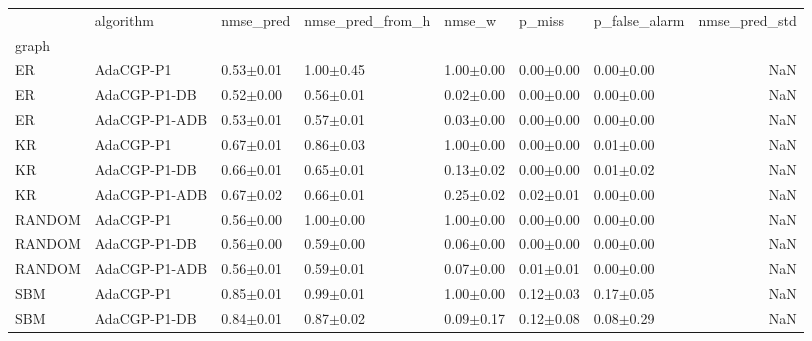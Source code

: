 \begin{tabular}{lllllllr}
\toprule
 & algorithm & nmse_pred & nmse_pred_from_h & nmse_w & p_miss & p_false_alarm & nmse_pred_std \\
graph &  &  &  &  &  &  &  \\
\midrule
ER & AdaCGP-P1 & 0.53{\scriptsize$\pm$0.01} & 1.00{\scriptsize$\pm$0.45} & 1.00{\scriptsize$\pm$0.00} & 0.00{\scriptsize$\pm$0.00} & 0.00{\scriptsize$\pm$0.00} & NaN \\
ER & AdaCGP-P1-DB & 0.52{\scriptsize$\pm$0.00} & 0.56{\scriptsize$\pm$0.01} & 0.02{\scriptsize$\pm$0.00} & 0.00{\scriptsize$\pm$0.00} & 0.00{\scriptsize$\pm$0.00} & NaN \\
ER & AdaCGP-P1-ADB & 0.53{\scriptsize$\pm$0.01} & 0.57{\scriptsize$\pm$0.01} & 0.03{\scriptsize$\pm$0.00} & 0.00{\scriptsize$\pm$0.00} & 0.00{\scriptsize$\pm$0.00} & NaN \\
KR & AdaCGP-P1 & 0.67{\scriptsize$\pm$0.01} & 0.86{\scriptsize$\pm$0.03} & 1.00{\scriptsize$\pm$0.00} & 0.00{\scriptsize$\pm$0.00} & 0.01{\scriptsize$\pm$0.00} & NaN \\
KR & AdaCGP-P1-DB & 0.66{\scriptsize$\pm$0.01} & 0.65{\scriptsize$\pm$0.01} & 0.13{\scriptsize$\pm$0.02} & 0.00{\scriptsize$\pm$0.00} & 0.01{\scriptsize$\pm$0.02} & NaN \\
KR & AdaCGP-P1-ADB & 0.67{\scriptsize$\pm$0.02} & 0.66{\scriptsize$\pm$0.01} & 0.25{\scriptsize$\pm$0.02} & 0.02{\scriptsize$\pm$0.01} & 0.00{\scriptsize$\pm$0.00} & NaN \\
RANDOM & AdaCGP-P1 & 0.56{\scriptsize$\pm$0.00} & 1.00{\scriptsize$\pm$0.00} & 1.00{\scriptsize$\pm$0.00} & 0.00{\scriptsize$\pm$0.00} & 0.00{\scriptsize$\pm$0.00} & NaN \\
RANDOM & AdaCGP-P1-DB & 0.56{\scriptsize$\pm$0.00} & 0.59{\scriptsize$\pm$0.00} & 0.06{\scriptsize$\pm$0.00} & 0.00{\scriptsize$\pm$0.00} & 0.00{\scriptsize$\pm$0.00} & NaN \\
RANDOM & AdaCGP-P1-ADB & 0.56{\scriptsize$\pm$0.01} & 0.59{\scriptsize$\pm$0.01} & 0.07{\scriptsize$\pm$0.00} & 0.01{\scriptsize$\pm$0.01} & 0.00{\scriptsize$\pm$0.00} & NaN \\
SBM & AdaCGP-P1 & 0.85{\scriptsize$\pm$0.01} & 0.99{\scriptsize$\pm$0.01} & 1.00{\scriptsize$\pm$0.00} & 0.12{\scriptsize$\pm$0.03} & 0.17{\scriptsize$\pm$0.05} & NaN \\
SBM & AdaCGP-P1-DB & 0.84{\scriptsize$\pm$0.01} & 0.87{\scriptsize$\pm$0.02} & 0.09{\scriptsize$\pm$0.17} & 0.12{\scriptsize$\pm$0.08} & 0.08{\scriptsize$\pm$0.29} & NaN \\

\end{tabular}
